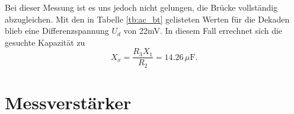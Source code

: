 Bei dieser Messung ist es uns jedoch nicht gelungen, die Brücke vollständig abzugleichen. Mit den in Tabelle \ref{tb:ac_bt} gelisteten Werten für die Dekaden blieb eine Differenzspannung $U_d$ von 22mV. In diesem Fall errechnet sich die gesuchte Kapazität zu
\begin{equation}
	X_x = \frac{R_3 X_1}{R_2} = 14.26\, \mu\text{F}.
\end{equation} 

\section{Messverstärker}
